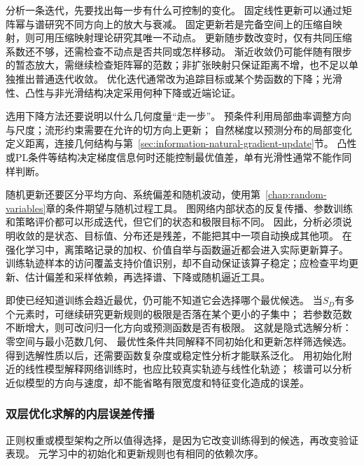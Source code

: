 分析一条迭代，先要找出每一步有什么可控制的变化。
固定线性更新可以通过矩阵幂与谱研究不同方向上的放大与衰减。
固定更新若是完备空间上的压缩自映射，则可用压缩映射理论研究其唯一不动点。
更新随步数改变时，仅有共同压缩系数还不够，还需检查不动点是否共同或怎样移动。
渐近收敛仍可能伴随有限步的暂态放大，需继续检查矩阵幂的范数；非扩张映射只保证距离不增，也不足以单独推出普通迭代收敛。
优化迭代通常改为追踪目标或某个势函数的下降；光滑性、凸性与非光滑结构决定采用何种下降或近端论证。

选用下降方法还要说明以什么几何度量“走一步”。
预条件利用局部曲率调整方向与尺度；流形约束需要在允许的切方向上更新；
自然梯度以预测分布的局部变化定义距离，连接几何结构与第~\ref{sec:information-natural-gradient-update}节。
凸性或PL条件等结构决定梯度信息何时还能控制最优值差，单有光滑性通常不能作同样判断。

随机更新还要区分平均方向、系统偏差和随机波动，使用第~\ref{chap:random-variables}章的条件期望与随机过程工具。
图网络内部状态的反复传播、参数训练和策略评价都可以形成迭代，但它们的状态和极限目标不同。
因此，分析必须说明收敛的是状态、目标值、分布还是残差，不能把其中一项自动换成其他项。
在强化学习中，离策略记录的加权、价值自举与函数逼近都会进入实际更新算子。
训练轨迹样本的访问覆盖支持价值识别，却不自动保证该算子稳定；应检查平均更新、估计偏差和采样依赖，再选择谱、下降或随机逼近工具。

即使已经知道训练会趋近最优，仍可能不知道它会选择哪个最优候选。
当$S_D$有多个元素时，可继续研究更新规则的极限是否落在某个更小的子集中；
若参数范数不断增大，则可改问归一化方向或预测函数是否有极限。
这就是隐式选解分析：零空间与最小范数几何、
最优性条件共同解释不同初始化和更新怎样筛选候选。
得到选解性质以后，还需要函数复杂度或稳定性分析才能联系泛化。
用初始化附近的线性模型解释网络训练时，也应比较真实轨迹与线性化轨迹；
核谱可以分析近似模型的方向与速度，却不能省略有限宽度和特征变化造成的误差。

\subsubsection{双层优化求解的内层误差传播}
\label{sec:future-analysis-nested-learning}

正则权重或模型架构之所以值得选择，是因为它改变训练得到的候选，再改变验证表现。
元学习中的初始化和更新规则也有相同的依赖次序。

